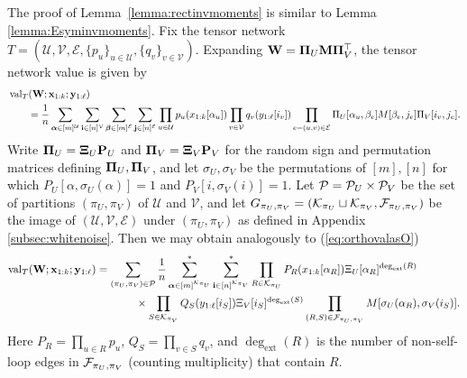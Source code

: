 \documentclass[10pt,reqno]{amsart}
\def\a{\alpha}
\def\b{\beta}
\def\x{\mathbf{x}}
\def\y{\mathbf{y}}
\def\W{\mathbf{W}}
\def\cU{\mathcal{U}}
\def\cV{\mathcal{V}}
\def\cE{\mathcal{E}}
\def\val{\operatorname{val}}
\def\bW{{\mathbf{W}}}
\def\bi{\mathbf{i}}
\def\bx{\mathbf{x}}
\newcommand{\degext}{\deg_\mathrm{ext}}
\begin{document}
The proof of Lemma~\ref{lemma:rectinvmoments} is similar to 
Lemma \ref{lemma:Esyminvmoments}. Fix the tensor network
$T=(\cU,\cV,\cE,\{p_u\}_{u \in \cU},\{q_v\}_{v \in \cV})$.
Expanding $\bW=\bPi_U\bM\bPi_V^\top$, the tensor network value is given by
\begin{align*}
&\val_T(\W;\x_{1:k};\y_{1:\ell})\\
&\qquad=\frac{1}{n}\sum_{\balpha \in [m]^\cU}
\sum_{\bi \in [n]^\cV}
\sum_{\bbeta \in [m]^\cE}
\sum_{\bj \in [n]^\cE}
\prod_{u \in \cU} p_u(x_{1:k}[\a_u])
\prod_{v \in \cV} q_v(y_{1:\ell}[i_v])
\prod_{e=(u,v) \in \cE} \Pi_U[\a_u,\b_e]M[\b_e,j_e] \Pi_V[i_v,j_e].
\end{align*}
Write $\bm{\Pi}_U = \bm{\Xi}_U\mathbf{P}_U$ and $\bm{\Pi}_V=\bm{\Xi}_V\mathbf{P}_V$ for the random
sign and permutation matrices defining $\bm{\Pi}_U,\bm{\Pi}_V$, and
let $\sigma_U,\sigma_V$ be the permutations of $[m],[n]$ for which
$P_U[\alpha,\sigma_U(\alpha)]=1$ and $P_V[i,\sigma_V(i)]=1$.
Let $\mathcal{P}=\mathcal{P}_U \times \mathcal{P}_V$ be the set of partitions $(\pi_U,\pi_V)$
of $\cU$ and $\cV$, and let
$G_{\pi_U,\pi_V} = (\mathcal{K}_{\pi_U} \sqcup \mathcal{K}_{\pi_V}, \mathcal{F}_{\pi_U,\pi_V})$
be the image of $(\cU,\cV,\cE)$ under $(\pi_U,\pi_V)$ as defined in
Appendix \ref{subsec:whitenoise}. Then
we may obtain analogously to (\ref{eq:orthovalasO})
\begin{align}\label{eq:rectinvval1}
	\val_T(\bW;\bx_{1:k};\by_{1:\ell})
	&=\sum_{(\pi_U,\pi_V)\in\cP} \frac{1}{n}
	\sum_{\balpha\in[m]^{\cK_{\pi_U}}}^*
	\sum_{\bi\in[n]^{\cK_{\pi_V}}}^*
	\prod_{R\in\cK_{\pi_U}} P_R(x_{1:k}[\alpha_R])
\Xi_U[\alpha_R]^{\degext(R)}\notag\\
&\hspace{0.5in}\times
\prod_{S\in\cK_{\pi_V}} Q_S(y_{1:\ell}[i_S]) \Xi_V[i_S]^{\degext(S)}
\prod_{(R,S)\in\cF_{\pi_U,\pi_V}} M[\sigma_U(\alpha_R),\sigma_V(i_S)].
\end{align}
Here $P_R=\prod_{u \in R} p_u$, $Q_S=\prod_{v \in S} q_v$, and
$\degext(R)$ is the number of non-self-loop edges in $\mathcal{F}_{\pi_U,\pi_V}$
(counting multiplicity) that contain $R$.
\end{document}
